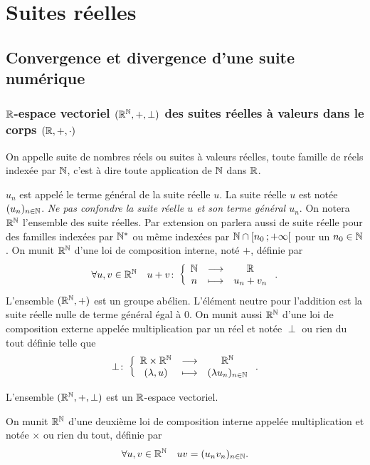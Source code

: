 \chapter{Suites  réelles}
\label{chap:suites}
\minitoc
\minilof
\minilot
\section{Convergence et divergence d'une suite numérique}

\subsection{\(\mathbb{R}\)-espace vectoriel \((\mathbb{R}^{\mathbb{N}},+,\perp)\) des suites réelles à 
valeurs dans le corps \((\mathbb{R},+, \cdot )\)}

\begin{defdef}
  On appelle suite de nombres réels ou suites à valeurs réelles, toute famille 
  de réels indexée par \(\mathbb{N}\), c'est à dire toute application de \(\mathbb{N}\) dans 
  \(\mathbb{R}\).
\end{defdef}
\(u_n\) est appelé le terme général de la suite réelle \(u\). La suite réelle 
\(u\) est notée \((u_n)_{n\in\mathbb{N}}\). \emph{Ne pas confondre la suite réelle \(u\) 
et son terme général \(u_n\)}. On notera \(\mathbb{R}^{\mathbb{N}}\) l'ensemble des suite 
réelles. Par extension on parlera aussi de suite réelle pour des familles 
indexées par \(\mathbb{N}^*\) ou même indexées par \(\mathbb{N} \cap 
\left[ n_0 \, ;  +\infty \right[\) pour un \(n_0 \in \mathbb{N}\). On munit \(\mathbb{R}^{\mathbb{N}}\) d'une 
loi de composition interne, noté \(+\), définie par
\begin{equation}
  \forall u,v \in \mathbb{R}^{\mathbb{N}} \quad u+v\colon \left\{\begin{array}{ccc} \mathbb{N} & \longrightarrow &\mathbb{R}\\ n & \longmapsto & u_n+v_n \end{array} \right..
\end{equation}
L'ensemble \((\mathbb{R}^{\mathbb{N}},+)\) est un groupe abélien. L'élément neutre pour l'addition 
est la suite réelle nulle de terme général égal à \(0\). On munit aussi 
\(\mathbb{R}^{\mathbb{N}}\) d'une loi de composition externe appelée multiplication par un réel et 
notée \(\perp\) ou rien du tout définie telle que
\begin{equation}
  \perp\colon \left\{\begin{array}{ccc} \mathbb{R}\times\mathbb{R}^{\mathbb{N}} & \longrightarrow &\mathbb{R}^{\mathbb{N}}\\ (\lambda,u) & \longmapsto & (\lambda u_n)_{n\in\mathbb{N}} \end{array} \right..
\end{equation}
\begin{prop}
  L'ensemble \((\mathbb{R}^{\mathbb{N}},+,\perp)\) est un \(\mathbb{R}\)-espace vectoriel.
\end{prop}
On munit \(\mathbb{R}^{\mathbb{N}}\) d'une deuxième loi de composition interne appelée 
multiplication et notée \(\times\) ou rien du tout, définie par
\begin{equation}
  \forall u,v \in \mathbb{R}^{\mathbb{N}} \quad uv = (u_nv_n)_{n\in \mathbb{N}}.
\end{equation}
